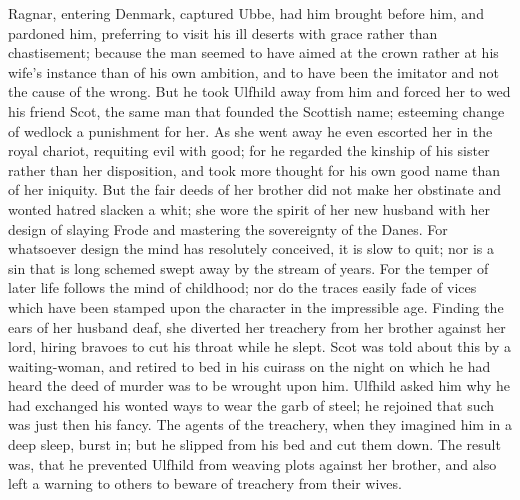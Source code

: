 \documentclass[10pt,a4paper]{report}
\begin{document}
Ragnar, entering Denmark, captured Ubbe, had him brought before him, and pardoned him, preferring to visit his ill deserts with grace rather than chastisement; because the man seemed to have aimed at the crown rather at his wife's instance than of his own ambition, and to have been the imitator and not the cause of the wrong. But he took Ulfhild away from him and forced her to wed his friend Scot, the same man that founded the Scottish name; esteeming change of wedlock a punishment for her. As she went away he even escorted her in the royal chariot, requiting evil with good; for he regarded the kinship of his sister rather than her disposition, and took more thought for his own good name than of her iniquity. But the fair deeds of her brother did not make her obstinate and wonted hatred slacken a whit; she wore the spirit of her new husband with her design of slaying Frode and mastering the sovereignty of the Danes. For whatsoever design the mind has resolutely conceived, it is slow to quit; nor is a sin that is long schemed swept away by the stream of years. For the temper of later life follows the mind of childhood; nor do the traces easily fade of vices which have been stamped upon the character in the impressible age. Finding the ears of her husband deaf, she diverted her treachery from her brother against her lord, hiring bravoes to cut his throat while he slept. Scot was told about this by a waiting-woman, and retired to bed in his cuirass on the night on which he had heard the deed of murder was to be wrought upon him. Ulfhild asked him why he had exchanged his wonted ways to wear the garb of steel; he rejoined that such was just then his fancy. The agents of the treachery, when they imagined him in a deep sleep, burst in; but he slipped from his bed and cut them down. The result was, that he prevented Ulfhild from weaving plots against her brother, and also left a warning to others to beware of treachery from their wives.\\
\end{document}

